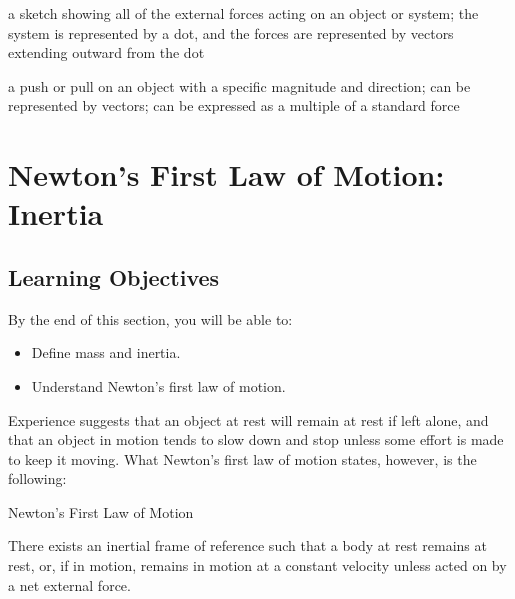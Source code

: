 \documentclass[
]{book}
\providecommand{\tightlist}{%
  \setlength{\itemsep}{0pt}\setlength{\parskip}{0pt}}
\newenvironment{learning-objectives}{}{}
\newenvironment{note}{}{}
\begin{document}
\begin{description}
\tightlist
\item[free-body diagram]
a sketch showing all of the external forces acting on an object or
system; the system is represented by a dot, and the forces are
represented by vectors extending outward from the dot
\end{description}

\begin{description}
\tightlist
\item[force]
a push or pull on an object with a specific magnitude and direction;
can be represented by vectors; can be expressed as a multiple of a
standard force
\end{description}

\hypertarget{newtons-first-law-of-motion-inertia}{%
\section{Newton's First Law of Motion: Inertia}\label{newtons-first-law-of-motion-inertia}}

\hypertarget{fs-id2242465}{}
\begin{learning-objectives}

\hypertarget{learning-objectives-13}{%
\subsection{Learning Objectives}\label{learning-objectives-13}}

By the end of this section, you will be able to:

\begin{itemize}
\tightlist
\item
  Define mass and inertia.
\item
  Understand Newton's first law of motion.
\end{itemize}

\end{learning-objectives}

Experience suggests that an object at rest will remain at rest if left
alone, and that an object in motion tends to slow down and stop unless
some effort is made to keep it moving. What \protect\hypertarget{import-auto-id1777407}{}{Newton's first law of
motion}\textbf{} states, however, is
the following:

\hypertarget{fs-id2690663}{}
\begin{note}

Newton's First Law of Motion

There exists an inertial frame of reference such that a body at rest
remains at rest, or, if in motion, remains in motion at a constant
velocity unless acted on by a net external force.

\end{note}
\end{document}
